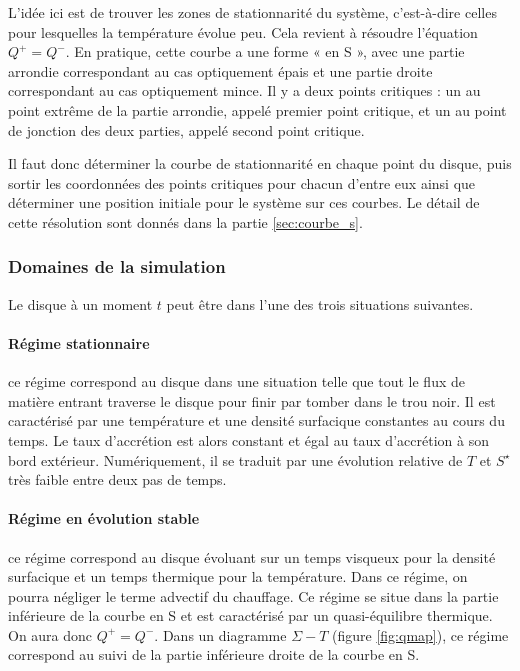 L’idée ici est de trouver les zones de stationnarité du système, c’est-à-dire
celles pour lesquelles la température évolue peu. Cela revient à résoudre
l’équation $Q^+ = Q^-$. En pratique, cette courbe a une forme « en S », avec
une partie arrondie correspondant au cas optiquement épais et une partie droite
correspondant au cas optiquement mince. Il y a deux points critiques : un au
point extrême de la partie arrondie, appelé premier point critique, et un au
point de jonction des deux parties, appelé second point critique.

Il faut donc déterminer la courbe de stationnarité en chaque point du disque,
puis sortir les coordonnées des points critiques pour chacun d’entre eux ainsi
que déterminer une position initiale pour le système sur ces courbes. Le détail de 
cette résolution sont donnés dans la partie \ref{sec:courbe_s}.

\subsubsection{Domaines de la simulation}
\label{ssec::domaine}
Le disque à un moment $t$ peut être dans l'une des trois situations suivantes.

\paragraph{Régime stationnaire} ce régime correspond au disque dans une
situation telle que tout le flux de matière entrant traverse le disque pour
finir par tomber dans le trou noir. Il est caractérisé par une température et
une densité surfacique constantes au cours du temps. Le taux d'accrétion est
alors constant et égal au taux d'accrétion à son bord extérieur. Numériquement,
il se traduit par une évolution relative de $T$ et $S^\star$ très faible entre
deux pas de temps. 

\paragraph{Régime en évolution stable} ce régime correspond au disque évoluant
sur un temps visqueux pour la densité surfacique et un temps thermique pour la
température. Dans ce régime, on pourra négliger le terme advectif du chauffage.
Ce régime se situe dans la partie inférieure de la courbe en S et est
caractérisé par un quasi-équilibre thermique. On aura donc $Q^+ = Q^-$. Dans un
diagramme $\Sigma-T$ (figure \ref{fig:qmap}), ce régime correspond au suivi de la partie inférieure
droite de la courbe en S. 

